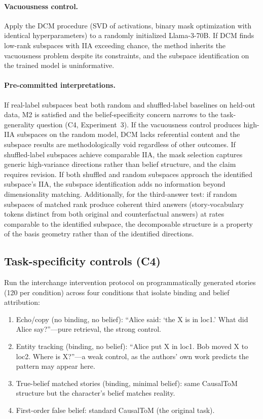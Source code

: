 \documentclass{article}
\begin{document}
\paragraph{Vacuousness control.} Apply the DCM procedure (SVD of activations, binary mask optimization with identical hyperparameters) to a randomly initialized Llama-3-70B. If DCM finds low-rank subspaces with IIA exceeding chance, the method inherits the \citet{sutter2025vacuous} vacuousness problem despite its constraints, and the subspace identification on the trained model is uninformative.

\paragraph{Pre-committed interpretations.} If real-label subspaces beat both random and shuffled-label baselines on held-out data, M2 is satisfied and the belief-specificity concern narrows to the task-generality question (C4, Experiment~3). If the vacuousness control produces high-IIA subspaces on the random model, DCM lacks referential content and the subspace results are methodologically void regardless of other outcomes. If shuffled-label subspaces achieve comparable IIA, the mask selection captures generic high-variance directions rather than belief structure, and the claim requires revision. If both shuffled and random subspaces approach the identified subspace's IIA, the subspace identification adds no information beyond dimensionality matching. Additionally, for the third-answer test: if random subspaces of matched rank produce coherent third answers (story-vocabulary tokens distinct from both original and counterfactual answers) at rates comparable to the identified subspace, the decomposable structure is a property of the basis geometry rather than of the identified directions.

\subsection{Task-specificity controls (C4)}

Run the interchange intervention protocol on programmatically generated stories (120 per condition) across four conditions that isolate binding and belief attribution:

\begin{enumerate}
\item Echo/copy (no binding, no belief): ``Alice said: `the X is in loc1.' What did Alice say?''---pure retrieval, the strong control.
\item Entity tracking (binding, no belief): ``Alice put X in loc1. Bob moved X to loc2. Where is X?''---a weak control, as the authors' own work predicts the pattern may appear here.
\item True-belief matched stories (binding, minimal belief): same CausalToM structure but the character's belief matches reality.
\item First-order false belief: standard CausalToM (the original task).
\end{enumerate}
\end{document}
